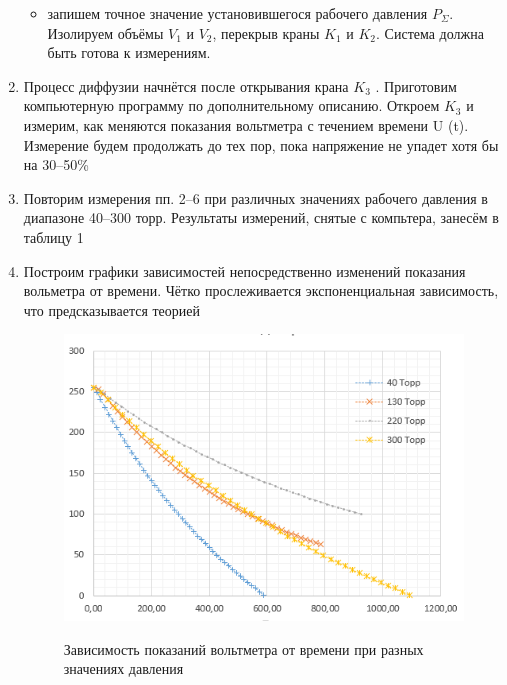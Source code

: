 \documentclass{article}
\begin{document}
\begin{enumerate}
\begin{itemize}
\item запишем точное значение установившегося рабочего давления $P_\Sigma$. Изолируем объёмы $V_1$ и $V_2$, перекрыв краны $K_1$ и $K_2$. Система должна быть готова к измерениям.
\end{itemize}
\item Процесс диффузии начнётся после открывания крана $K_3$ . Приготовим компьютерную программу по дополнительному описанию. Откроем $K_3$ и измерим, как меняются показания вольтметра с течением времени U (t). Измерение будем продолжать до тех пор, пока напряжение не упадет хотя бы на 30–50\%
\item  Повторим измерения пп. 2–6 при различных значениях рабочего давления в диапазоне 40–300 торр. Результаты измерений, снятые с компьтера, занесём в таблицу 1

\item Построим графики зависимостей непосредственно изменений показания вольметра от времени. Чётко прослеживается экспоненциальная зависимость, что предсказывается теорией
\begin{figure}[h]
    \centering
    \begin{center}
    \caption{Зависимость показаний вольтметра от времени при разных значениях давления}
    \end{center}
    \includegraphics[width=\textwidth]{exp.PNG}
    \label{fig:vac}
\end{figure} 


\end{enumerate}
\end{document}
